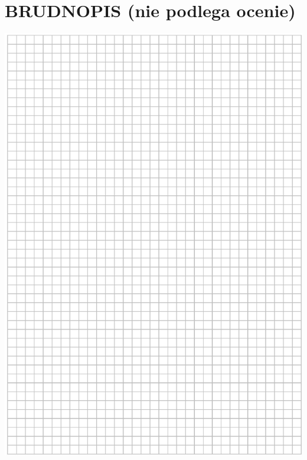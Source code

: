 \documentclass[10pt]{article}
\begin{document}
\section*{BRUDNOPIS (nie podlega ocenie)}
\includegraphics[max width=\textwidth, center]{2024_11_21_0a35d272448d5080a489g-30}\\
\end{document}

